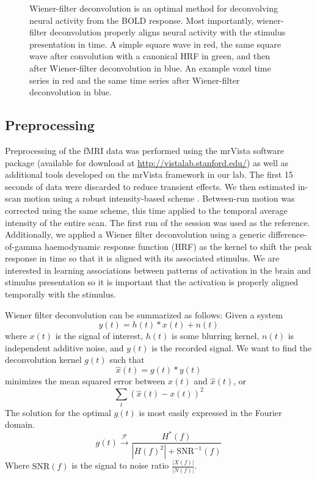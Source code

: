 \documentclass[preprint,5p,authoryear]{elsarticle}
\begin{document}
\begin{figure}
\begin{subfigure}{0.4\textwidth}
\caption{}
\label{fig:wiener-voxel}
\end{subfigure}
\caption{
Wiener-filter deconvolution is an optimal method for deconvolving neural activity from the BOLD response.
Most importantly, wiener-filter deconvolution properly aligns neural activity with the stimulus presentation in time.
 A simple square wave in red, the same square wave after convolution with a canonical HRF in green, and then after Wiener-filter deconvolution in blue. 
 An example voxel time series in red and the same time series after Wiener-filter deconvolution in blue.}
\label{fig:wiener-deconvolution}
\end{figure}

\subsection{Preprocessing}
Preprocessing of the fMRI data was performed using the mrVista software package (available for download at \url{http://vistalab.stanford.edu/}) as well as additional tools developed on the mrVista framework in our lab. 
The first 15 seconds of data  were discarded to reduce transient effects.
We then estimated in-scan motion using a robust intensity-based scheme \citep{Nestares2000}. 
Between-run motion was corrected using the same scheme, this time applied to the temporal average intensity of the entire scan. 
The first run of the session was used as the reference. 
Additionally, we applied a Wiener filter deconvolution \citep{Poor1980} using a generic difference-of-gamma haemodynamic response function (HRF) \citep{Glover1999} as the kernel to shift the peak response in time so that it is aligned with its associated stimulus.
We are interested in learning associations between patterns of activation in the brain and stimulus presentation so it is important that the activation is properly aligned temporally with the stimulus.

Wiener filter deconvolution can be summarized as follows:
Given a system
\begin{equation}
y(t) = h(t) \ast x(t) + n(t)
\end{equation}
where $x(t)$ is the signal of interest, $h(t)$ is some blurring kernel, $n(t)$ is independent additive noise, and $y(t)$ is the recorded signal.
We want to find the deconvolution kernel $g(t)$ such that 
\begin{equation}
\hat{x}(t) = g(t) \ast y(t)
\end{equation}
minimizes the mean squared error between $x(t)$ and $\hat{x}(t)$, or
\begin{equation}
\sum_{t}{\left( \hat{x}(t) - x(t) \right)^{2}}
\end{equation}
The solution for the optimal $g(t)$ is most easily expressed in the Fourier domain.
\begin{equation}
g(t) \xrightarrow{\mathcal{F}} \frac{H^{*}(f)}{\left|H(f)^{2}\right| + \mbox{SNR}^{-1}(f)}
\end{equation}
Where $\mbox{SNR}(f)$ is the signal to noise ratio $\frac{\left| X(f) \right|}{\left| N(f) \right|}$.
\end{document}
